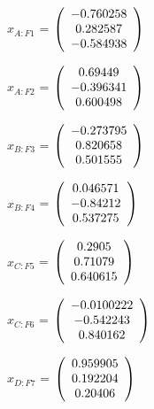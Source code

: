 \begin{description}
$\hat{x}_{A:F1}$ = $\left( \begin{array} {ccc}  -0.760258 \\   0.282587 \\  -0.584938 
\end{array} \right)\\ \\$

$\hat{x}_{A:F2}$ = $\left( \begin{array} {ccc}    0.69449 \\  -0.396341 \\   0.600498 
\end{array} \right)\\ \\$

$\hat{x}_{B:F3}$ = $\left( \begin{array} {ccc}  -0.273795 \\   0.820658 \\   0.501555 
\end{array} \right)\\ \\$

$\hat{x}_{B:F4}$ = $\left( \begin{array} {ccc}   0.046571 \\   -0.84212 \\   0.537275 
\end{array} \right)\\ \\$

$\hat{x}_{C:F5}$ = $\left( \begin{array} {ccc}     0.2905 \\    0.71079 \\   0.640615 
\end{array} \right)\\ \\$

$\hat{x}_{C:F6}$ = $\left( \begin{array} {ccc} -0.0100222 \\  -0.542243 \\   0.840162 
\end{array} \right)\\ \\$

$\hat{x}_{D:F7}$ = $\left( \begin{array} {ccc}   0.959905 \\   0.192204 \\    0.20406 
\end{array} \right)\\ \\$


\end{description}
